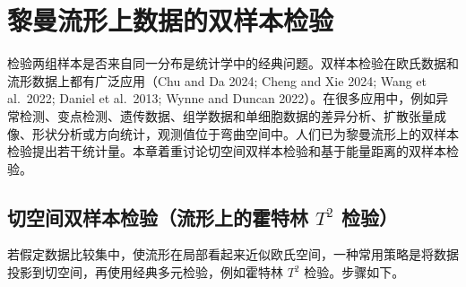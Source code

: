 \section{黎曼流形上数据的双样本检验}

检验两组样本是否来自同一分布是统计学中的经典问题。双样本检验在欧氏数据和流形数据上都有广泛应用（Chu and Da 2024; Cheng and Xie 2024; Wang et al.\ 2022; Daniel et al.\ 2013; Wynne and Duncan 2022）。在很多应用中，例如异常检测、变点检测、遗传数据、组学数据和单细胞数据的差异分析、扩散张量成像、形状分析或方向统计，观测值位于弯曲空间中。人们已为黎曼流形上的双样本检验提出若干统计量。本章着重讨论切空间双样本检验和基于能量距离的双样本检验。

\subsection{切空间双样本检验（流形上的霍特林 \texorpdfstring{$T^2$}{T²} 检验）}

若假定数据比较集中，使流形在局部看起来近似欧氏空间，一种常用策略是将数据投影到切空间，再使用经典多元检验，例如霍特林 $T^2$ 检验。步骤如下。

